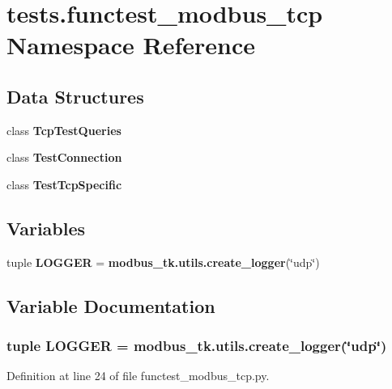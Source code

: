 \section{tests.\+functest\+\_\+modbus\+\_\+tcp Namespace Reference}
\label{namespacetests_1_1functest__modbus__tcp}
\subsection*{Data Structures}
\begin{DoxyCompactItemize}
\item 
class {\bf Tcp\+Test\+Queries}
\item 
class {\bf Test\+Connection}
\item 
class {\bf Test\+Tcp\+Specific}
\end{DoxyCompactItemize}
\subsection*{Variables}
\begin{DoxyCompactItemize}
\item 
tuple {\bf L\+O\+G\+G\+E\+R} = {\bf modbus\+\_\+tk.\+utils.\+create\+\_\+logger}(\char`\"{}udp\char`\"{})
\end{DoxyCompactItemize}


\subsection{Variable Documentation}
\subsubsection[{L\+O\+G\+G\+E\+R}]{\setlength{\rightskip}{0pt plus 5cm}tuple L\+O\+G\+G\+E\+R = {\bf modbus\+\_\+tk.\+utils.\+create\+\_\+logger}(\char`\"{}udp\char`\"{})}\label{namespacetests_1_1functest__modbus__tcp_ae9c29667350ae00a0837fc1e77c279e2}


Definition at line 24 of file functest\+\_\+modbus\+\_\+tcp.\+py.

